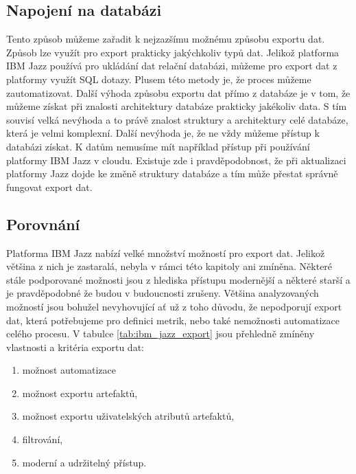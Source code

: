 \documentclass[czech,master]{diploma}
\begin{document}
\subsection{Napojení na databázi}
Tento způsob můžeme zařadit k nejzazšímu možnému způsobu exportu dat. Způsob lze využít pro export prakticky jakýchkoliv typů dat. Jelikož platforma IBM Jazz používá pro ukládání dat relační databázi, můžeme pro export dat z platformy využít SQL dotazy. Plusem této metody je, že proces můžeme zautomatizovat. Další výhoda způsobu exportu dat přímo z databáze je v tom, že můžeme získat při znalosti architektury databáze prakticky jakékoliv data. S tím souvisí velká nevýhoda a to právě znalost struktury a architektury celé databáze, která je velmi komplexní. Další nevýhoda je, že ne vždy můžeme přístup k databázi získat. K datům nemusíme mít například přístup při používání platformy IBM Jazz v cloudu. Existuje zde i pravděpodobnost, že při aktualizaci platformy Jazz dojde ke změně struktury databáze a tím může přestat správně fungovat export dat.

\subsection{Porovnání}
Platforma IBM Jazz nabízí velké množství možností pro export dat. Jelikož většina z nich je zastaralá, nebyla v rámci této kapitoly ani zmíněna. Některé stále podporované možnosti jsou z hlediska přístupu modernější a některé starší a je pravděpodobné že budou v budoucnosti zrušeny. Většina analyzovaných možností jsou bohužel nevyhovující ať už z toho důvodu, že nepodporují export dat, která potřebujeme pro definici metrik, nebo také nemožnosti automatizace celého procesu. V tabulce \ref{tab:ibm_jazz_export} jsou přehledně zmíněny vlastnosti a kritéria exportu dat:

\begin{enumerate}
\item možnost automatizace
\item možnost exportu artefaktů,
\item možnost exportu uživatelských atributů artefaktů,
\item filtrování,
\item moderní a udržitelný přístup.
\end{enumerate}
\end{document}
